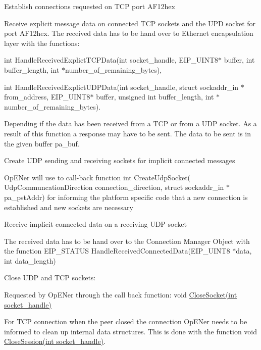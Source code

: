 \begin{DoxyItemize}
\item \-Establish connections requested on \-T\-C\-P port \-A\-F12hex
\item \-Receive explicit message data on connected \-T\-C\-P sockets and the \-U\-P\-D socket for port \-A\-F12hex. \-The received data has to be hand over to \-Ethernet encapsulation layer with the functions\-: \par
 int \-Handle\-Received\-Explict\-T\-C\-P\-Data(int socket\-\_\-handle, \-E\-I\-P\-\_\-\-U\-I\-N\-T8$\ast$ buffer, int buffer\-\_\-length, int $\ast$number\-\_\-of\-\_\-remaining\-\_\-bytes),\par
 int \-Handle\-Received\-Explict\-U\-D\-P\-Data(int socket\-\_\-handle, struct sockaddr\-\_\-in $\ast$from\-\_\-address, \-E\-I\-P\-\_\-\-U\-I\-N\-T8$\ast$ buffer, unsigned int buffer\-\_\-length, int $\ast$number\-\_\-of\-\_\-remaining\-\_\-bytes).\par
 \-Depending if the data has been received from a \-T\-C\-P or from a \-U\-D\-P socket. \-As a result of this function a response may have to be sent. \-The data to be sent is in the given buffer pa\-\_\-buf.
\item \-Create \-U\-D\-P sending and receiving sockets for implicit connected messages\par
 \-Op\-E\-Ner will use to call-\/back function int \-Create\-Udp\-Socket( \-Udp\-Communcation\-Direction connection\-\_\-direction, struct sockaddr\-\_\-in $\ast$pa\-\_\-pst\-Addr) for informing the platform specific code that a new connection is established and new sockets are necessary
\item \-Receive implicit connected data on a receiving \-U\-D\-P socket\par
 \-The received data has to be hand over to the \-Connection \-Manager \-Object with the function \-E\-I\-P\-\_\-\-S\-T\-A\-T\-U\-S \-Handle\-Received\-Connected\-Data(\-E\-I\-P\-\_\-\-U\-I\-N\-T8 $\ast$data, int data\-\_\-length)
\item \-Close \-U\-D\-P and \-T\-C\-P sockets\-:
\begin{DoxyEnumerate}
\item \-Requested by \-Op\-E\-Ner through the call back function\-: void \hyperlink{group__CIP__CALLBACK__API_ga89293c1274a9092dec6be806b8d0779f}{\-Close\-Socket(int socket\-\_\-handle)}
\item \-For \-T\-C\-P connection when the peer closed the connection \-Op\-E\-Ner needs to be informed to clean up internal data structures. \-This is done with the function void \hyperlink{group__CIP__API_gab9ff230d61fc6dedd90f8b95e9a27707}{\-Close\-Session(int socket\-\_\-handle)}.

\end{DoxyEnumerate}
\end{DoxyItemize}

